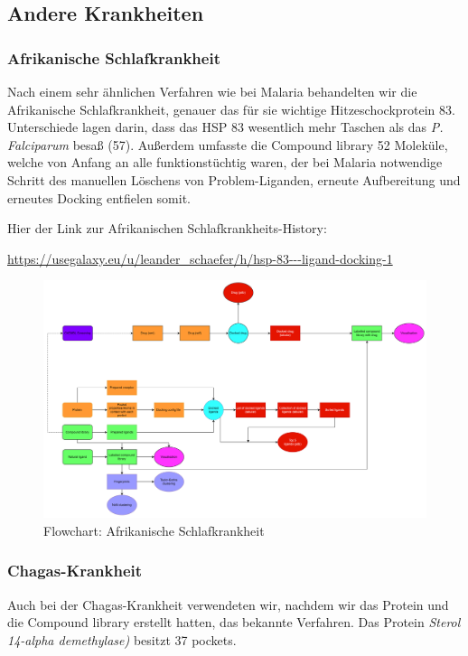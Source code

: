 \documentclass[10pt]{article}
\begin{document}
    \subsection{Andere Krankheiten}\label{subsubsec:andere-krankheiten}

    \subsubsection{Afrikanische Schlafkrankheit}
    Nach einem sehr ähnlichen Verfahren wie bei Malaria behandelten wir die Afrikanische Schlafkrankheit, genauer das
    für sie wichtige Hitzeschockprotein 83. Unterschiede lagen darin, dass das HSP 83 wesentlich mehr Taschen als
    das \emph{P. Falciparum} besaß (57). Außerdem umfasste die Compound library 52 Moleküle, welche von Anfang an alle
    funktionstüchtig waren, der bei Malaria notwendige Schritt des manuellen Löschens von Problem-Liganden, erneute
    Aufbereitung und erneutes Docking entfielen somit.

    Hier der Link zur Afrikanischen Schlafkrankheits-History:

    \url{https://usegalaxy.eu/u/leander_schaefer/h/hsp-83---ligand-docking-1}


    \begin{figure}[h]
        \centering
        \includegraphics[width=0.7\linewidth]{afrikanische schlafkrankheit-flowchart}
        \caption{Flowchart: Afrikanische Schlafkrankheit}
    \end{figure}

    \subsubsection{Chagas-Krankheit}
    Auch bei der Chagas-Krankheit verwendeten wir, nachdem wir das Protein und die Compound library erstellt hatten,
    das bekannte Verfahren.
    Das Protein \emph{Sterol 14-alpha demethylase)} besitzt 37 pockets.
\end{document}
